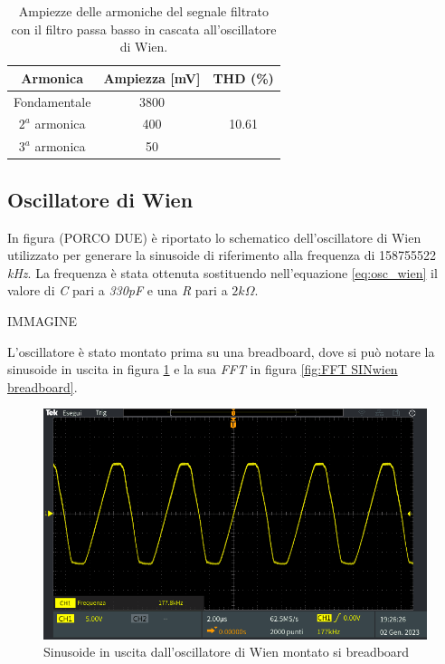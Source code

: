 \documentclass[titlepage]{report}
\begin{document}
	\begin{table}[h!]
		\centering
		\begin{tabular}{||c|c|c||}
			\hline
			\cellcolor{gray!10}Armonica & \cellcolor{gray!10}Ampiezza [mV] & \cellcolor{gray!10}THD (\%) \\
			\hline
			Fondamentale & 3800 &\\
			\cline{1-2}
			$2^a$ armonica & 400 & 10.61 \\
			\cline{1-2} 
			$3^a$ armonica & 50 & \\
			\hline	
		\end{tabular}
		\caption{Ampiezze delle armoniche del segnale filtrato con il filtro passa basso in cascata all'oscillatore di Wien.}
		\label{tab:THD_WIEN+LP}
	\end{table}

	\subsection{Oscillatore di Wien}
	\label{subsc: wien giusto}

	In figura (PORCO DUE) è riportato lo schematico dell'oscillatore di Wien utilizzato per generare la sinusoide di riferimento alla frequenza di 158755522 \textit{kHz}. La frequenza è stata ottenuta sostituendo nell'equazione \ref{eq:osc_wien} il valore di \textit{C} pari a \textit{330pF} e una \textit{R} pari a \textit{$2 k\Omega$}.

	IMMAGINE

	L'oscillatore è stato montato prima su una breadboard, dove si può notare la sinusoide in uscita in figura \ref{fig:SINwien breadboard} e la sua \textit{FFT} in figura \ref{fig:FFT SINwien breadboard}.


	\begin{figure}[H]
		\centering
		\includegraphics[scale=0.5]{Immagini/Wien sin giusto bread.PNG}
		\caption{Sinusoide in uscita dall'oscillatore di Wien montato si breadboard}
		\label{fig:SINwien breadboard}
	\end{figure} 
\end{document}
